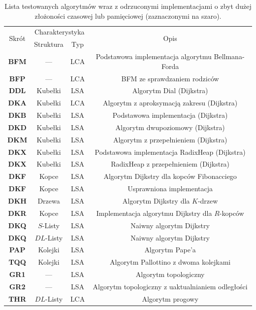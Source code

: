 \begin{table}[ht]
	\centering
	\begin{tabular}{cccc}
		\hline
		\multirow{2}{*}{Skrót} & \multicolumn{2}{|c|}{Charakterystyka} & \multirow{2}{*}{Opis} \\ \cline{2-3}
		& \multicolumn{1}{|c|}{Struktura} & \multicolumn{1}{c|}{Typ} &  \\
		\hline
		\textcolor{lgray}{\textbf{BFM}} & --- & \textsc{LCA} & Podstawowa implementacja algorytmu Bellmana-Forda \\
		\textcolor{lgray}{\textbf{BFP}} & --- & \textsc{LCA} & \textsc{BFM} ze sprawdzaniem rodziców \\
		\textbf{DDL} & Kubełki & \textsc{LSA} & Algorytm Dial (Dijkstra) \\
		\textbf{DKA} & Kubełki & \textsc{LCA} & Algorytm z aproksymacją zakresu (Dijkstra) \\
		\textcolor{lgray}{\textbf{DKB}} & Kubełki & \textsc{LSA} & Podstawowa implementacja (Dijkstra) \\
		\textbf{DKD} & Kubełki & \textsc{LSA} & Algorytm dwupoziomowy (Dijkstra) \\
		\textbf{DKM} & Kubełki & \textsc{LSA} & Algorytm z przepełnieniem (Dijkstra) \\
		\textcolor{lgray}{\textbf{DKX}} & Kubełki & \textsc{LSA} & Podstawowa implementacja \textsf{RadixHeap} (Dijkstra) \\
		\textbf{DKX} & Kubełki & \textsc{LSA} & \textsf{RadixHeap} z przepełnieniem (Dijkstra) \\
		\textcolor{lgray}{\textbf{DKF}} & Kopce & \textsc{LSA} & Algorytm Dijkstry dla kopców Fibonacciego \\
		\textbf{DKF} & Kopce & \textsc{LSA} & Usprawniona implementacja \text{DKF} \\
		\textcolor{lgray}{\textbf{DKH}} & Drzewa & \textsc{LSA} & Algorytm Dijkstry dla $K$-drzew \\
		\textbf{DKR} & Kopce & \textsc{LSA} & Implementacja algorytmu Dijkstry dla $R$-kopców \\
		\textcolor{lgray}{\textbf{DKQ}} & $S$-Listy & \textsc{LSA} & Naiwny algorytm Dijkstry \\
		\textcolor{lgray}{\textbf{DKQ}} & $DL$-Listy & \textsc{LSA} & Naiwny algorytm Dijkstry \\
		\textcolor{lgray}{\textbf{PAP}} & Kolejki & \textsc{LSA} & Algorytm Pape'a \\
		\textbf{TQQ} & Kolejki & \textsc{LSA} & Algorytm Pallottino z dwoma kolejkami \\
		\textcolor{lgray}{\textbf{GR1}} & --- & \textsc{LSA} & Algorytm topologiczny \\
		\textcolor{lgray}{\textbf{GR2}} & --- & \textsc{LSA} & Algorytm topologiczny z uaktualnianiem odległości \\
		\textbf{THR} & $DL$-Listy & \textsc{LCA} & Algorytm progowy \\
		\hline
	\end{tabular}
	\caption{
		Lista testowanych algorytmów wraz z odrzuconymi implementacjami o zbyt dużej złożoności czasowej lub pamięciowej (zaznaczonymi na szaro).
	}
	\label{tab:testAlg}
\end{table}

